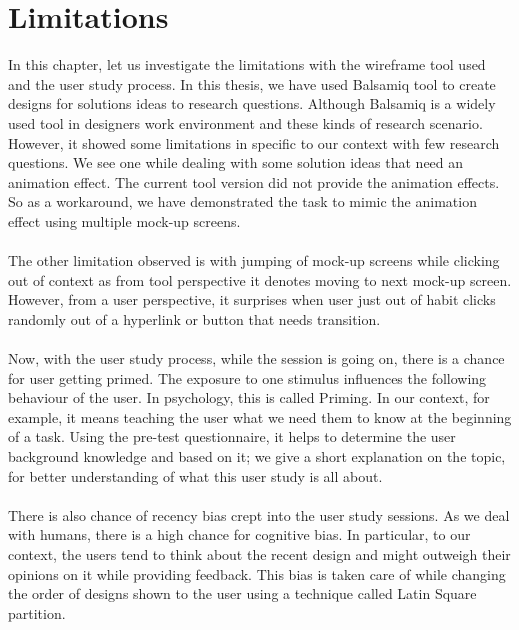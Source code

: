 \chapter{Limitations}
\label{ch:limitations_report}

In this chapter, let us investigate the limitations with the wireframe tool used and the user study process. In this thesis, we have used Balsamiq tool to create designs for solutions ideas to research questions. Although Balsamiq is a widely used tool in designers work environment and these kinds of research scenario. However, it showed some limitations in specific to our context with few research questions. We see one while dealing with some solution ideas that need an animation effect. The current tool version did not provide the animation effects. So as a workaround, we have demonstrated the task to mimic the animation effect using multiple mock-up screens. \\ \\

The other limitation observed is with jumping of mock-up screens while clicking out of context as from tool perspective it denotes moving to next mock-up screen. However, from a user perspective, it surprises when user just out of habit clicks randomly out of a hyperlink or button that needs transition. \\ \\

Now, with the user study process, while the session is going on, there is a chance for user getting primed. The exposure to one stimulus influences the following behaviour of the user. In psychology, this is called Priming. \cite{priming} In our context, for example, it means teaching the user what we need them to know at the beginning of a task. Using the pre-test questionnaire, it helps to determine the user background knowledge and based on it; we give a short explanation on the topic, for better understanding of what this user study is all about. \\ \\

There is also chance of recency bias crept into the user study sessions. As we deal with humans, there is a high chance for cognitive bias. In particular, to our context, the users tend to think about the recent design and might outweigh their opinions on it while providing feedback. This bias is taken care of while changing the order of designs shown to the user using a technique called Latin Square partition. \cite{lsp} \\ \\

